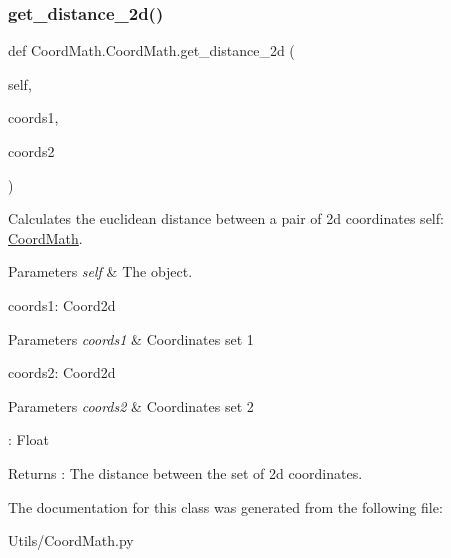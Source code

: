\subsubsection{\texorpdfstring{get\+\_\+distance\+\_\+2d()}{get\_distance\_2d()}}
{\footnotesize\ttfamily def Coord\+Math.\+Coord\+Math.\+get\+\_\+distance\+\_\+2d (\begin{DoxyParamCaption}\item[{}]{self,  }\item[{}]{coords1,  }\item[{}]{coords2 }\end{DoxyParamCaption})}



Calculates the euclidean distance between a pair of 2d coordinates  self\+: \hyperlink{classCoordMath_1_1CoordMath}{Coord\+Math}. 


\begin{DoxyParams}{Parameters}
{\em self} & The object.\\
\hline
\end{DoxyParams}
coords1\+: Coord2d 
\begin{DoxyParams}{Parameters}
{\em coords1} & Coordinates set 1\\
\hline
\end{DoxyParams}
coords2\+: Coord2d 
\begin{DoxyParams}{Parameters}
{\em coords2} & Coordinates set 2\\
\hline
\end{DoxyParams}
\+: Float \begin{DoxyReturn}{Returns}
\+: The distance between the set of 2d coordinates. 
\end{DoxyReturn}


The documentation for this class was generated from the following file\+:\begin{DoxyCompactItemize}
\item 
Utils/Coord\+Math.\+py\end{DoxyCompactItemize}
